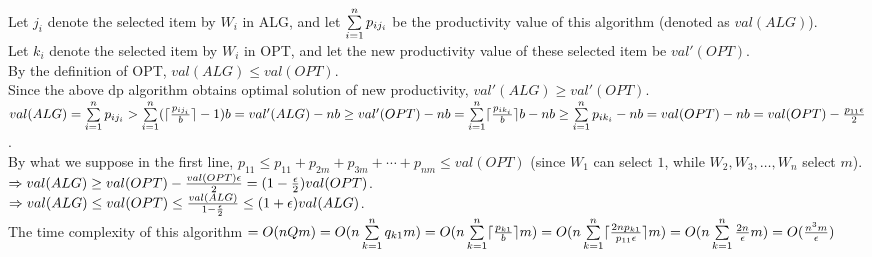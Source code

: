 \begin{pr}
Let $j_i$ denote the selected item by $W_i$ in ALG, and let $\sum\limits_{i=1}^np_{ij_i}$ be the productivity value of this algorithm (denoted as $val(ALG)$).\\
Let $k_i$ denote the selected item by $W_i$ in OPT, and let the new productivity value of these selected item be $val'(OPT)$.\\
By the definition of OPT, $val(ALG)\leq val(OPT)$.\\
Since the above dp algorithm obtains optimal solution of new productivity, $val'(ALG)\geq val'(OPT)$.\\
$val(ALG)=\sum\limits_{i=1}^np_{ij_i}>\sum\limits_{i=1}^n(\lceil\frac{p_{ij_i}}b\rceil-1)b=val'(ALG)-nb\geq val'(OPT)-nb=\sum\limits_{i=1}^n\lceil\frac{p_{ik_i}}b\rceil b-nb\geq\sum\limits_{i=1}^np_{ik_i}-nb=val(OPT)-nb=val(OPT)-\frac{p_{11}\epsilon}2$.\\
By what we suppose in the first line, $p_{11}\leq p_{11}+p_{2m}+p_{3m}+\cdots+p_{nm}\leq val(OPT)$ (since $W_1$ can select $1$, while $W_2, W_3, \dots, W_n$ select $m$).\\
$\Rightarrow val(ALG)\geq val(OPT)-\frac{val(OPT)\epsilon}2=(1-\frac{\epsilon}2)val(OPT)$.\\
$\Rightarrow val(ALG)\leq val(OPT)\leq\frac{val(ALG)}{1-\frac{\epsilon}2}\leq(1+\epsilon)val(ALG)$.\\
The time complexity of this algorithm $=O(nQm)=O(n\sum\limits_{k=1}^nq_{k1}m)=O(n\sum\limits_{k=1}^n\lceil\frac{p_{k1}}b\rceil m)=O(n\sum\limits_{k=1}^n\lceil\frac{2np_{k1}}{p_{11}\epsilon}\rceil m)=O(n\sum\limits_{k=1}^n\frac{2n}\epsilon m)=O(\frac{n^3m}\epsilon)$
\end{pr}
